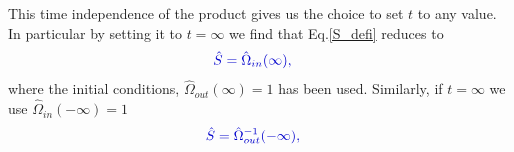 \documentclass[12pt, titlepage]{article}
\begin{document}
This time independence of the product gives us the choice to set $ t $ to any value. In particular by setting it to $ t=\infty $ we find that Eq.\enskip\eqref{S_defi} reduces to 
\begin{equation}\label{S_first_3_1}
\textcolor[RGB]{0,0,204}{
\begin{split}
\hat{S} 
&=\hat{\Omega}_{in}(\infty)
,
\end{split}
}
\end{equation}
where the initial conditions, $\hat{\Omega}_{out}(\infty) = 1  $  has been used. Similarly, if $ t=\infty $ we use $ \hat{\Omega}_{in}(-\infty)=1 $ 
\begin{equation}\label{S_first_3_2}
\textcolor[RGB]{0,0,204}{
\begin{split}
\hat{S}
&=\hat{\Omega}^{-1}_{out}(-\infty)
,
\end{split}
}
\end{equation}
\end{document}
